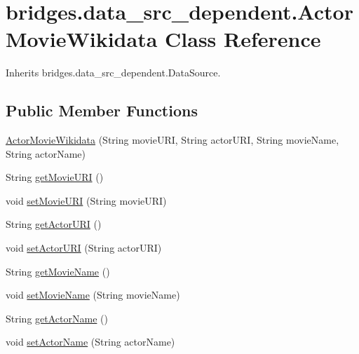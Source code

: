 \hypertarget{classbridges_1_1data__src__dependent_1_1_actor_movie_wikidata}{}\section{bridges.\+data\+\_\+src\+\_\+dependent.\+Actor\+Movie\+Wikidata Class Reference}
\label{classbridges_1_1data__src__dependent_1_1_actor_movie_wikidata}


Inherits bridges.\+data\+\_\+src\+\_\+dependent.\+Data\+Source.

\subsection*{Public Member Functions}
\begin{DoxyCompactItemize}
\item 
\hyperlink{classbridges_1_1data__src__dependent_1_1_actor_movie_wikidata_a0204efcc0ee869cf059228b99965a9ad}{Actor\+Movie\+Wikidata} (String movie\+U\+RI, String actor\+U\+RI, String movie\+Name, String actor\+Name)
\item 
String \hyperlink{classbridges_1_1data__src__dependent_1_1_actor_movie_wikidata_a36b856c85ef3e634c6f6cb79402c1469}{get\+Movie\+U\+RI} ()
\item 
void \hyperlink{classbridges_1_1data__src__dependent_1_1_actor_movie_wikidata_a83b6e202e9ff88aa0d5afbc467edabc7}{set\+Movie\+U\+RI} (String movie\+U\+RI)
\item 
String \hyperlink{classbridges_1_1data__src__dependent_1_1_actor_movie_wikidata_a39fb69868ed39bb9c43cf512300e47a3}{get\+Actor\+U\+RI} ()
\item 
void \hyperlink{classbridges_1_1data__src__dependent_1_1_actor_movie_wikidata_a48281ef156f333742f0377820e35d461}{set\+Actor\+U\+RI} (String actor\+U\+RI)
\item 
String \hyperlink{classbridges_1_1data__src__dependent_1_1_actor_movie_wikidata_a8c10a2fbd4db1223dfb6c115457bbfa0}{get\+Movie\+Name} ()
\item 
void \hyperlink{classbridges_1_1data__src__dependent_1_1_actor_movie_wikidata_ab327cb180c9912357318efa02ee1ea40}{set\+Movie\+Name} (String movie\+Name)
\item 
String \hyperlink{classbridges_1_1data__src__dependent_1_1_actor_movie_wikidata_a46d666a914ade6d3fcc99ddfd8d104bf}{get\+Actor\+Name} ()
\item 
void \hyperlink{classbridges_1_1data__src__dependent_1_1_actor_movie_wikidata_adcc408940f750be41cc25d70653dac07}{set\+Actor\+Name} (String actor\+Name)
\end{DoxyCompactItemize}


